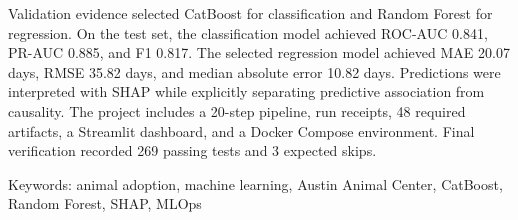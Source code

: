 Validation evidence selected CatBoost for classification and Random Forest for regression. On the test set, the classification model achieved ROC-AUC 0.841, PR-AUC 0.885, and F1 0.817. The selected regression model achieved MAE 20.07 days, RMSE 35.82 days, and median absolute error 10.82 days. Predictions were interpreted with SHAP while explicitly separating predictive association from causality. The project includes a 20-step pipeline, run receipts, 48 required artifacts, a Streamlit dashboard, and a Docker Compose environment. Final verification recorded 269 passing tests and 3 expected skips.

\vspace{20pt}
\noindent Keywords: animal adoption, machine learning, Austin Animal Center, CatBoost, Random Forest, SHAP, MLOps
